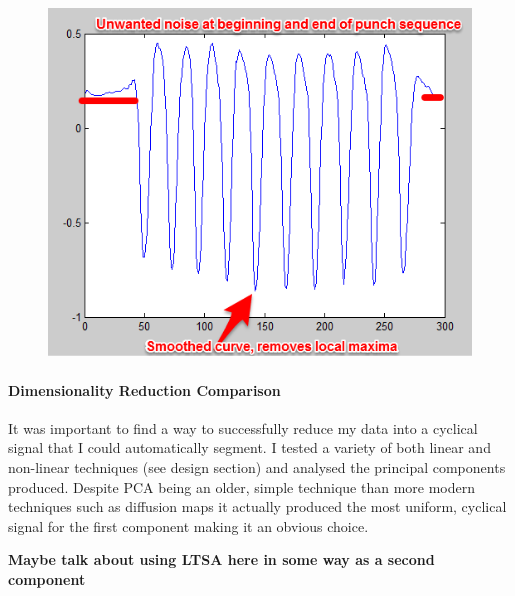 \begin{figure}[h]
    \centering
    \includegraphics[height=0.25\textheight]{fig04/fig03}
    \label{fig:kinect}
\end{figure}


\paragraph {Dimensionality Reduction Comparison}
It was important to find a way to successfully reduce my data into a cyclical signal that I could automatically segment. I tested a variety of both linear and non-linear techniques (see design section) and analysed the principal components produced. Despite PCA being an older, simple technique than more modern techniques such as diffusion maps it actually produced the most uniform, cyclical signal for the first component making it an obvious choice.

{\bf Maybe talk about using LTSA here in some way as a second component}




